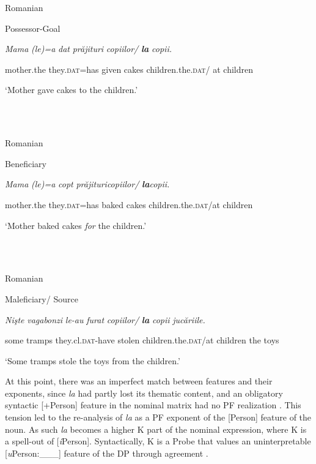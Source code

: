 \documentclass[output=paper,colorlinks,citecolor=brown]{./langscibook}
\begin{document}
          Romanian

Possessor-Goal

\textit{Mama}     \textit{(le)=a}     \textit{dat}  \textit{prăjituri}   \textit{copiilor/}  \textbf{\textit{la} }\textit{copii.} 

mother.the  they.\textsc{dat}=has   given   cakes   children.the.\textsc{dat}/ at children

‘Mother gave cakes to the children.’

\ea%
    \label{ex:key:15}
    \gll\\
        \\
    \glt
    \z

          Romanian

Beneficiary

\textit{Mama}     \textit{(le)=a}     \textit{copt}  \textit{prăjituricopiilor/}  \textbf{\textit{la}}\textit{copii.}

  mother.the  they.\textsc{dat}=has   baked   cakes   children.the.\textsc{dat}/at children

  ‘Mother baked cakes \textit{for} the children.’

\ea%
    \label{ex:key:16}
    \gll\\
        \\
    \glt
    \z

          Romanian

Maleficiary/ Source

\textit{Nişte} \textit{vagabonzi} \textit{le-au}   \textit{furat}  \textit{copiilor/}  \textbf{\textit{la} }\textit{copii}  \textit{jucăriile.} 

  some tramps  they.cl.\textsc{dat-}have stolen children.the.\textsc{dat}/at children the toys

  ‘Some tramps stole the toys from the children.’

At this point, there was an imperfect match between features and their exponents, since \textit{la} had partly lost its thematic content, and an obligatory syntactic [+Person] feature in the nominal matrix had no PF realization . This tension led to the re-analysis of \textit{la} as a PF exponent of the [Person] feature of the noun. As such \textit{la} becomes a higher K part of the nominal expression, where K is a spell-out of [\textit{i}Person]. Syntactically, K is a Probe that values an uninterpretable [\textit{u}Person:\_\_\_] feature of the DP through agreement .

\ea%
    \label{ex:key:17}
    \gll\\
        \\
    \glt
    \z
\end{document}
